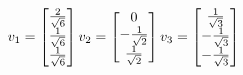 \documentclass[preview]{standalone}
\begin{document}
\begin{align*}
\special{dvisvgm:raw <g id='unique000'>}v_1 = \begin{bmatrix} \frac{2}{\sqrt{6}} \\ \frac{1}{\sqrt{6}} \\ \frac{1}{\sqrt{6}} \end{bmatrix} \special{dvisvgm:raw </g>}\special{dvisvgm:raw <g id='unique001'>}v_2 = \begin{bmatrix} 0 \\ -\frac{1}{\sqrt{2}} \\ \frac{1}{\sqrt{2}} \end{bmatrix} \special{dvisvgm:raw </g>}\special{dvisvgm:raw <g id='unique002'>}v_3 = \begin{bmatrix} \frac{1}{\sqrt{3}} \\ -\frac{1}{\sqrt{3}} \\ -\frac{1}{\sqrt{3}} \end{bmatrix}\special{dvisvgm:raw </g>}
\end{align*}
\end{document}
